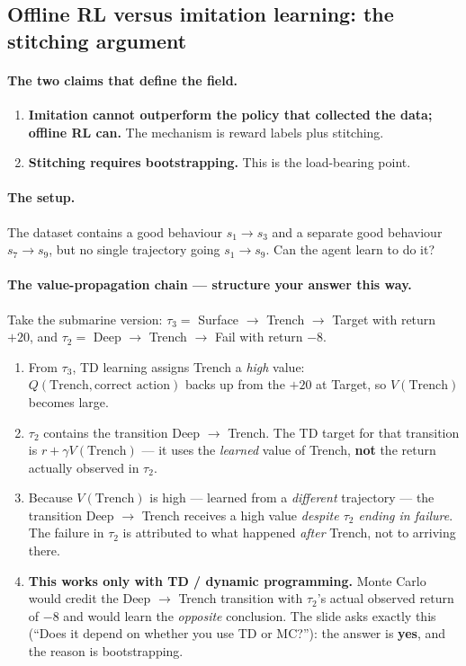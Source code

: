 \documentclass[11pt,a4paper]{article}
\begin{document}
\subsection{Offline RL versus imitation learning: the stitching argument}

\paragraph{The two claims that define the field.}
\begin{enumerate}[label=\arabic*.]
\item \textbf{Imitation cannot outperform the policy that collected the
data; offline RL can.} The mechanism is reward labels plus stitching.
\item \textbf{Stitching requires bootstrapping.} This is the load-bearing
point.
\end{enumerate}

\paragraph{The setup.} The dataset contains a good behaviour $s_1\to s_3$ and a
separate good behaviour $s_7\to s_9$, but no single trajectory going
$s_1\to s_9$. Can the agent learn to do it?

\paragraph{The value-propagation chain --- structure your answer this way.}
Take the submarine version: $\tau_3=$ Surface $\to$ Trench $\to$ Target with
return $+20$, and $\tau_2=$ Deep $\to$ Trench $\to$ Fail with return $-8$.
\begin{enumerate}[label=\arabic*.]
\item From $\tau_3$, TD learning assigns Trench a \emph{high} value:
$Q(\text{Trench},\text{correct action})$ backs up from the $+20$ at Target,
so $V(\text{Trench})$ becomes large.
\item $\tau_2$ contains the transition Deep $\to$ Trench. The TD target for
that transition is $r+\gamma V(\text{Trench})$ --- it uses the \emph{learned}
value of Trench, \textbf{not} the return actually observed in $\tau_2$.
\item Because $V(\text{Trench})$ is high --- learned from a
\emph{different} trajectory --- the transition Deep $\to$ Trench receives a
high value \emph{despite $\tau_2$ ending in failure}. The failure in $\tau_2$
is attributed to what happened \emph{after} Trench, not to arriving there.
\item \textbf{This works only with TD / dynamic programming.} Monte Carlo
would credit the Deep $\to$ Trench transition with $\tau_2$'s actual observed
return of $-8$ and would learn the \emph{opposite} conclusion. The slide asks
exactly this (``Does it depend on whether you use TD or MC?''): the answer is
\textbf{yes}, and the reason is bootstrapping.
\end{enumerate}
\end{document}

